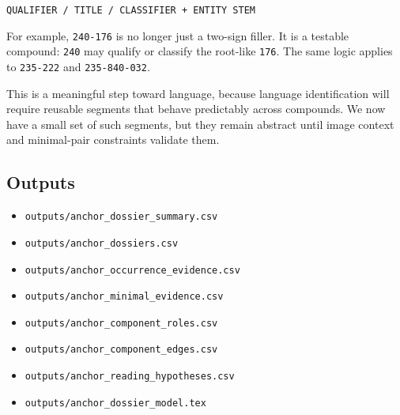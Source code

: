 \begin{center}
\texttt{QUALIFIER / TITLE / CLASSIFIER + ENTITY STEM}
\end{center}

For example, \texttt{240-176} is no longer just a two-sign filler. It is a testable compound: \texttt{240} may qualify or classify the root-like \texttt{176}. The same logic applies to \texttt{235-222} and \texttt{235-840-032}.

This is a meaningful step toward language, because language identification will require reusable segments that behave predictably across compounds. We now have a small set of such segments, but they remain abstract until image context and minimal-pair constraints validate them.

\subsection{Outputs}

\begin{itemize}
  \item \texttt{outputs/anchor\_dossier\_summary.csv}
  \item \texttt{outputs/anchor\_dossiers.csv}
  \item \texttt{outputs/anchor\_occurrence\_evidence.csv}
  \item \texttt{outputs/anchor\_minimal\_evidence.csv}
  \item \texttt{outputs/anchor\_component\_roles.csv}
  \item \texttt{outputs/anchor\_component\_edges.csv}
  \item \texttt{outputs/anchor\_reading\_hypotheses.csv}
  \item \texttt{outputs/anchor\_dossier\_model.tex}
\end{itemize}
